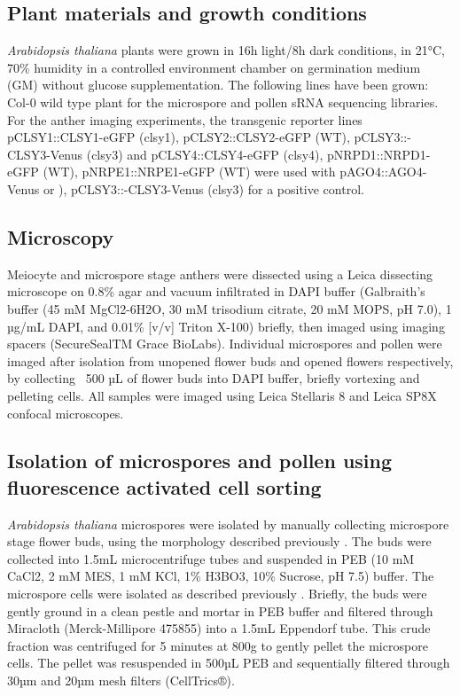 \subsection{Plant materials and growth conditions}

\textit{Arabidopsis thaliana} plants were grown in 16h light/8h dark conditions, in 21°C, 70\% humidity in a controlled environment chamber on germination medium (GM) without glucose supplementation. The following lines have been grown: Col-0 wild type plant for the microspore and pollen sRNA sequencing libraries. For the anther imaging experiments, the transgenic reporter lines pCLSY1::CLSY1-eGFP (clsy1), pCLSY2::CLSY2-eGFP (WT), pCLSY3::-CLSY3-Venus (clsy3) and pCLSY4::CLSY4-eGFP (clsy4), pNRPD1::NRPD1-eGFP (WT), pNRPE1::NRPE1-eGFP (WT) were used with pAGO4::AGO4-Venus or ), pCLSY3::-CLSY3-Venus (clsy3) for a positive control.

\subsection{Microscopy}

Meiocyte and microspore stage anthers were dissected using a Leica dissecting microscope on 0.8\% agar and vacuum infiltrated in DAPI buffer (Galbraith’s buffer (45 mM MgCl2-6H2O, 30 mM trisodium citrate, 20 mM MOPS, pH 7.0), 1 µg/mL DAPI, and 0.01\% [v/v] Triton X-100) briefly, then imaged using imaging spacers (SecureSealTM Grace BioLabs). Individual microspores and pollen were imaged after isolation from unopened flower buds and opened flowers respectively, by collecting ~500 µL of flower buds into DAPI buffer, briefly vortexing and pelleting cells. All samples were imaged using Leica Stellaris 8 and Leica SP8X confocal microscopes.

\subsection{Isolation of microspores and pollen using fluorescence activated cell sorting}

\textit{Arabidopsis thaliana} microspores were isolated by manually collecting microspore stage flower buds, using the morphology described previously \cite{RN86}. The buds were collected into 1.5mL microcentrifuge tubes and suspended in PEB (10 mM CaCl2, 2 mM MES, 1 mM KCl, 1\% H3BO3, 10\% Sucrose, pH 7.5) buffer. The microspore cells were isolated as described previously \cite{RN140}. Briefly, the buds were gently ground in a clean pestle and mortar in PEB buffer and filtered through Miracloth (Merck-Millipore 475855) into a 1.5mL Eppendorf tube. This crude fraction was centrifuged for 5 minutes at 800g to gently pellet the microspore cells. The pellet was resuspended in 500µL PEB and sequentially filtered through 30µm and 20µm mesh filters (CellTrics®).

